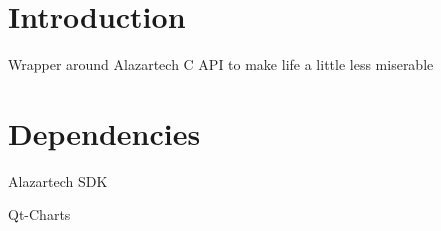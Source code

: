 \hypertarget{index_intro_sec}{}\section{Introduction}\label{index_intro_sec}
Wrapper around Alazartech C A\+PI to make life a little less miserable\hypertarget{index_Base}{}\section{Dependencies}\label{index_Base}
\begin{DoxyItemize}
\item Alazartech S\+DK \item Qt-\/\+Charts \end{DoxyItemize}
